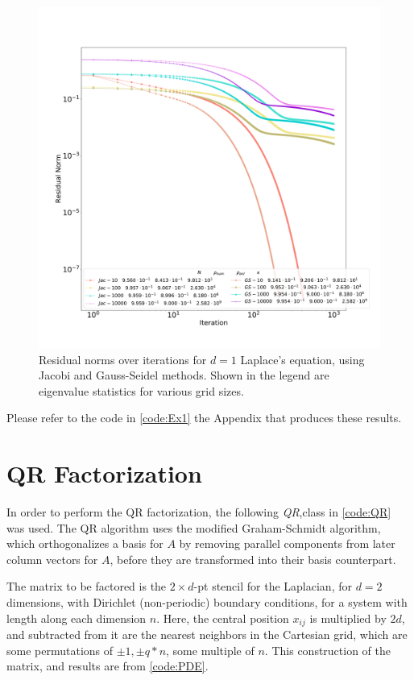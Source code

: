 \documentclass[12pt,letterpaper]{article}
\begin{document}
\begin{figure}[H]
  \centering
  \includegraphics[width=\textwidth]{figures/Ex1.pdf}
  \caption{Residual norms over iterations for $d=1$ Laplace's equation, using Jacobi and Gauss-Seidel methods. Shown in the legend are eigenvalue statistics for various grid sizes.}
  \label{fig:FixedPt}
\end{figure}

Please refer to the code in \cref{code:Ex1} the Appendix that produces these results.



\newpage
\section{QR Factorization}
In order to perform the QR factorization, the following \textit{QR},class in \cref{code:QR} was used. The QR algorithm uses the modified Graham-Schmidt algorithm, which orthogonalizes a basis for $A$ by removing parallel components from later column vectors for $A$, before they are transformed into their basis counterpart.

The matrix to be factored is the $2\times d$-pt stencil for the Laplacian, for $d=2$ dimensions, with Dirichlet (non-periodic) boundary conditions, for a system with length along each dimension $n$. Here, the central position $x_{ij}$ is multiplied by $2d$, and subtracted from it are the nearest neighbors in the Cartesian grid, which are some permutations of $\pm 1, \pm q*n$, some multiple of $n$. This construction of the matrix, and results are from \cref{code:PDE}.
\end{document}
